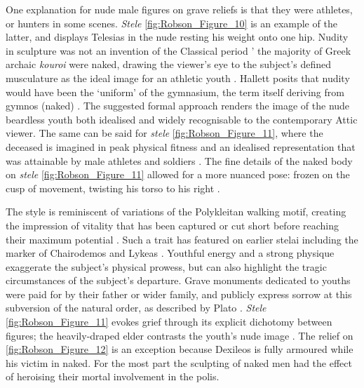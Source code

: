 One explanation for nude male figures on grave reliefs is that they were athletes, or hunters in some scenes. \textit{Stele} \ref{fig:Robson_Figure_10} is an example of the latter, and displays Telesias in the nude resting his weight onto one hip.
Nudity in sculpture was not an invention of the Classical period ' the majority of Greek archaic \textit{kouroi} were naked, drawing the viewer’s eye to the subject’s defined musculature as the ideal image for an athletic youth \parencite[115]{Boardman1995}.
Hallett posits that nudity would have been the \enquote*{uniform} of the gymnasium, the term itself deriving from gymnos (naked) \parencite[22]{Hallett2005}.
The suggested formal approach renders the image of the nude beardless youth both idealised and widely recognisable to the contemporary Attic viewer. The same can be said for \textit{stele} \ref{fig:Robson_Figure_11}, where the deceased is imagined in peak physical fitness and an idealised representation that was attainable by male athletes and soldiers \parencite[94]{Stupperich1994}.
The fine details of the naked body on \textit{stele} \ref{fig:Robson_Figure_11} allowed for a more nuanced pose: frozen on the cusp of movement, twisting his torso to his right \parencite[200]{Osborne1998}.

The style is reminiscent of variations of the Polykleitan walking motif, creating the impression of vitality that has been captured or cut short before reaching their maximum potential \parencite[163]{Childs1998}.
Such a trait has featured on earlier stelai including the marker of Chairodemos and Lykeas \parencite[162]{Childs1998}.
Youthful energy and a strong physique exaggerate the subject’s physical prowess, but can also highlight the tragic circumstances of the subject’s departure. Grave monuments dedicated to youths were paid for by their father or wider family, and publicly express sorrow at this subversion of the natural order, as described by Plato \parencite[195]{Wasserman1969}. \textit{Stele} \ref{fig:Robson_Figure_11} evokes grief through its explicit dichotomy between figures;
the heavily-draped elder contrasts the youth’s nude image \parencite[116]{Boardman1995}.
The relief on \ref{fig:Robson_Figure_12} is an exception because Dexileos is fully armoured while his victim in naked. For the most part the sculpting of naked men had the effect of heroising their mortal involvement in the polis.

